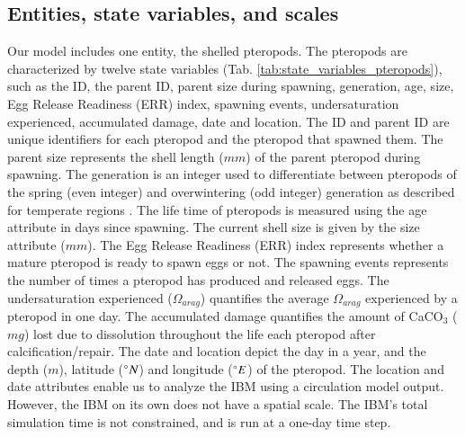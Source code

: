 \subsection{Entities, state variables, and scales}\label{sec:entities}

Our model includes one entity, the shelled pteropods. The pteropods are characterized by twelve state variables (Tab. \ref{tab:state_variables_pteropods}), such as the ID, the parent ID, parent size during spawning, generation, age, size, Egg Release Readiness (ERR) index, spawning events, undersaturation experienced, accumulated damage, date and location. 
The ID and parent ID are unique identifiers for each pteropod and the pteropod that spawned them. The parent size represents the shell length ($mm$) of the parent pteropod during spawning. The generation is an integer used to differentiate between pteropods of the spring (even integer) and overwintering (odd integer) generation as described for temperate regions \citep{Dadon1992Reproduction,lalli1989pelagic,Wang2017Lifecycle,Maas2020Lipids}. The life time of pteropods is measured using the age attribute in days since spawning. The current shell size is given by the size attribute ($mm$). The Egg Release Readiness (ERR) index \citep[similar to the Clutch Readiness Fraction presented in ][]{Miller1998CalanusIBM} represents whether a mature pteropod is ready to spawn eggs or not. The spawning events represents the number of times a pteropod has produced and released eggs. The undersaturation experienced ($\Omega_{arag}$) quantifies the average $\Omega_{arag}$ experienced by a pteropod in one day. The accumulated damage quantifies the amount of CaCO$_3$ ($mg$) lost due to dissolution throughout the life each pteropod after calcification/repair. The date and location depict the day in a year, and the depth ($m$), latitude ($\degree N$) and longitude ($\degree E$) of the pteropod. The location and date attributes enable us to analyze the IBM using a circulation model output. However, the IBM on its own does not have a spatial scale. The IBM's total simulation time is not constrained, and is run at a one-day time step.

